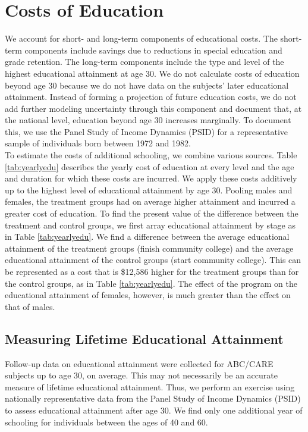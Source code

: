 \section{Costs of Education} \label{appendix:education}

\noindent We account for short- and long-term components of educational costs. The short-term components include savings due to reductions in special education and grade retention. The long-term components include the type and level of the highest educational attainment at age 30. We do not calculate costs of education beyond age 30 because we do not have data on the subjects' later educational attainment. Instead of forming a projection of future education costs, we do not add further modeling uncertainty through this component and document that, at the national level, education beyond age 30 increases marginally. To document this, we use the Panel Study of Income Dynamics (PSID) for a representative sample of individuals born between 1972 and 1982. \\

\noindent To estimate the costs of additional schooling, we combine various sources. Table \ref{tab:yearlyedu}  describes the yearly cost of education at every level and the age and duration for which these costs are incurred. We apply these costs additively up to the highest level of educational attainment by age 30. Pooling males and females, the treatment groups had on average higher attainment and incurred a greater cost of education. To find the present value of the difference between the treatment and control groups, we first array educational attainment by stage as in Table \ref{tab:yearlyedu}. We find a difference between the average educational attainment of the treatment groups (finish community college) and the average educational attainment of the control groups (start community college). This can be represented as a cost that is \$12,586 higher for the treatment groups than for the control groups, as in Table \ref{tab:yearlyedu}. The effect of the program on the educational attainment of females, however, is much greater than the effect on that of males.

\subsection{Measuring Lifetime Educational Attainment}

\noindent Follow-up data on educational attainment were collected for ABC/CARE subjects up to age 30, on average. This may not necessarily be an accurate measure of lifetime educational attainment. Thus, we perform an exercise using nationally representative data from the Panel Study of Income Dynamics (PSID) to assess educational attainment after age 30. We find only one additional year of schooling for individuals between the ages of 40 and 60. \\

